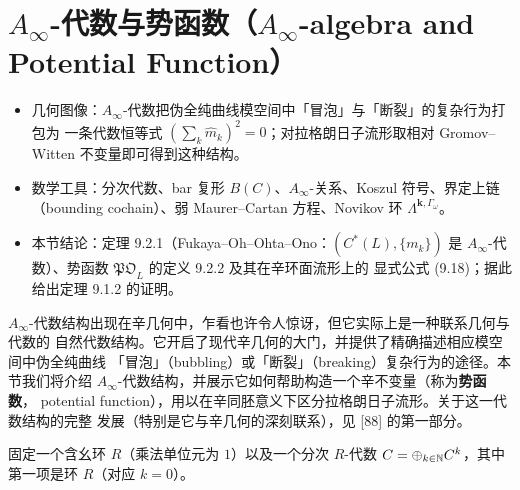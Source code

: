 
\section{$A_\infty$-代数与势函数（$A_\infty$-algebra and Potential Function）}

\begin{keytakeaways}
\begin{itemize}
  \item 几何图像：$A_\infty$-代数把伪全纯曲线模空间中「冒泡」与「断裂」的复杂行为打包为
        一条代数恒等式 $(\sum_k\hat m_k)^2=0$；对拉格朗日子流形取相对
        Gromov--Witten 不变量即可得到这种结构。
  \item 数学工具：分次代数、bar 复形 $B(C)$、$A_\infty$-关系、Koszul 符号、界定上链
        （bounding cochain）、弱 Maurer--Cartan 方程、Novikov 环
        $\Lambda^{\mathbf{k},\Gamma_\omega}$。
  \item 本节结论：定理 9.2.1（Fukaya--Oh--Ohta--Ono：$(C^*(L),\{m_k\})$ 是
        $A_\infty$-代数）、势函数 $\mathfrak{PO}_L$ 的定义 9.2.2 及其在辛环面流形上的
        显式公式 (9.18)；据此给出定理 9.1.2 的证明。
\end{itemize}
\end{keytakeaways}

$A_\infty$-代数结构出现在辛几何中，乍看也许令人惊讶，但它实际上是一种联系几何与代数的
自然代数结构。它开启了现代辛几何的大门，并提供了精确描述相应模空间中伪全纯曲线
「冒泡」（bubbling）或「断裂」（breaking）复杂行为的途径。本节我们将介绍
$A_\infty$-代数结构，并展示它如何帮助构造一个辛不变量（称为\textbf{势函数}，
potential function），用以在辛同胚意义下区分拉格朗日子流形。关于这一代数结构的完整
发展（特别是它与辛几何的深刻联系），见 [88] 的第一部分。

固定一个含幺环 $R$（乘法单位元为 $1$）以及一个分次 $R$-代数
$C=\oplus_{k\in\mathbb{N}}C^k$，其中第一项是环 $R$（对应 $k=0$）。

